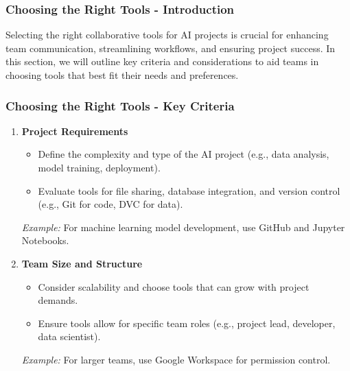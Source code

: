 \documentclass[aspectratio=169]{beamer}
\begin{document}
\begin{frame}[fragile]
    \frametitle{Choosing the Right Tools - Introduction}
    Selecting the right collaborative tools for AI projects is crucial for enhancing team communication, streamlining workflows, and ensuring project success. In this section, we will outline key criteria and considerations to aid teams in choosing tools that best fit their needs and preferences.
\end{frame}

\begin{frame}[fragile]
    \frametitle{Choosing the Right Tools - Key Criteria}
    \begin{enumerate}
        \item \textbf{Project Requirements}
            \begin{itemize}
                \item Define the complexity and type of the AI project (e.g., data analysis, model training, deployment).
                \item Evaluate tools for file sharing, database integration, and version control (e.g., Git for code, DVC for data).
            \end{itemize}
            \textit{Example:} For machine learning model development, use GitHub and Jupyter Notebooks.
        
        \item \textbf{Team Size and Structure}
            \begin{itemize}
                \item Consider scalability and choose tools that can grow with project demands.
                \item Ensure tools allow for specific team roles (e.g., project lead, developer, data scientist).
            \end{itemize}
            \textit{Example:} For larger teams, use Google Workspace for permission control.
    \end{enumerate}
\end{frame}
\end{document}
